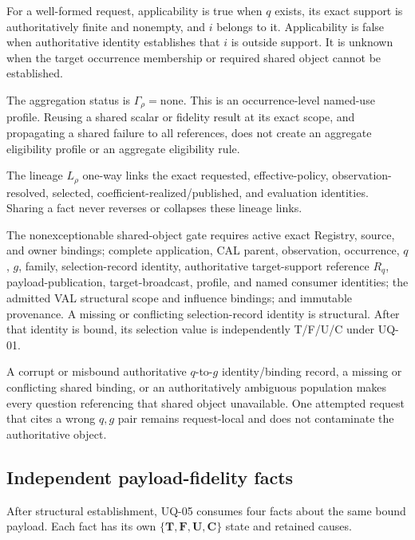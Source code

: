 For a well-formed request, applicability is true when \(q\) exists, its exact
support is authoritatively finite and nonempty, and \(i\) belongs to it.
Applicability is false when authoritative identity establishes that \(i\) is
outside support. It is unknown when the target occurrence membership or
required shared object cannot be established.

The aggregation status is \(\Gamma_\rho=\mathrm{none}\). This is an
occurrence-level named-use profile. Reusing a shared scalar or fidelity result
at its exact scope, and propagating a shared failure to all references, does
not create an aggregate eligibility profile or an aggregate eligibility rule.

The lineage \(L_\rho\) one-way links the exact requested, effective-policy,
observation-resolved, selected, coefficient-realized/published, and evaluation
identities. Sharing a fact never reverses or collapses these lineage links.

The nonexceptionable shared-object gate requires active exact Registry,
source, and owner bindings; complete application, CAL parent, observation,
occurrence, \(q\), \(g\), family, selection-record identity, authoritative
target-support reference \(R_q\), payload-publication, target-broadcast,
profile, and named consumer identities; the admitted VAL structural scope and
influence bindings; and immutable provenance. A missing or
conflicting selection-record identity is structural. After that identity is
bound, its selection value is independently T/F/U/C under UQ-01.

A corrupt or misbound authoritative \(q\)-to-\(g\) identity/binding record, a
missing or conflicting shared binding, or an authoritatively ambiguous population makes
every question referencing that shared object unavailable. One attempted
request that cites a wrong \(q,g\) pair remains request-local and does not
contaminate the authoritative object.

\subsection{Independent payload-fidelity facts}

After structural establishment, UQ-05 consumes four facts about the same bound
payload. Each fact has its own \(\{\mathbf T,\mathbf F,\mathbf U,\mathbf C\}\)
state and retained causes.

